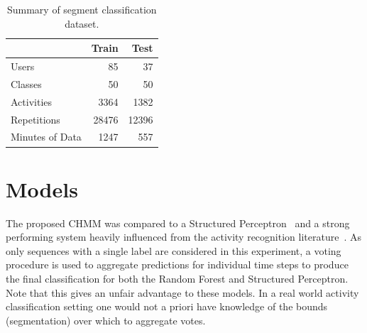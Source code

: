 \documentclass[12pt]{report}
\newcommand{\1}[0]{\mathbbm{1}}
\begin{document}
\begin{table}[ht]
    \centering
    \begin{tabular}{l r r}\hline
    & \textbf{Train} &\textbf{Test} \\\hline
    Users & 85 & 37\\
    Classes & 50 & 50\\
    Activities & 3364 & 1382\\
    Repetitions & 28476 & 12396\\
    Minutes of Data & 1247 & 557\\
    \end{tabular}
    \caption[Summary of segment classification dataset]{
        Summary of segment classification dataset.
    }
    \label{table:segment-dataset}
\end{table}

\section{Models}
The proposed \ac{CHMM} was compared to a Structured Perceptron~\cite{perceptron-collins}
and a strong performing system heavily influenced from the activity recognition literature~\cite{ms-activity}.
As only sequences with a single label are considered in this experiment, a voting procedure is used
to aggregate predictions for individual time steps to produce the final classification for both
the Random Forest and Structured Perceptron. Note that this gives an unfair advantage to these
models. In a real world activity classification setting one would not a priori have knowledge of
the bounds (segmentation) over which to aggregate votes.
\end{document}

